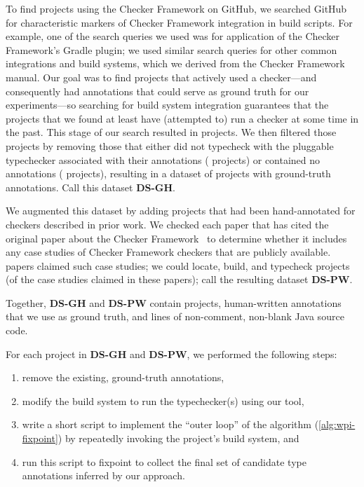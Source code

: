 To find projects using the Checker Framework on GitHub, we searched GitHub for characteristic
markers of Checker Framework integration in build scripts. For example, one of the search
queries we used was for application of the Checker Framework's Gradle plugin; we used similar
search queries for other common integrations and build systems, which we derived from
the Checker Framework manual.
Our goal was to find projects that actively used a checker---and
consequently had annotations that could serve as ground truth for our experiments---so
searching for build system integration guarantees that the projects that we found at least
have (attempted to) run a checker at some time in the past. This stage of our search
resulted in  projects. We then filtered those projects by removing those that
either did not typecheck with the pluggable typechecker associated with their annotations (
projects) or contained no annotations ( projects),
resulting in a dataset of  projects with ground-truth annotations.
Call this dataset \textbf{DS-GH}.

We augmented this dataset by adding projects that had been hand-annotated for checkers
described in prior work. We checked each paper that has cited the original paper
about the Checker Framework~\cite{PapiACPE2008} to determine whether it includes any
case studies of Checker Framework checkers that are publicly available.  papers
claimed such case studies; we could locate, build, and typecheck  projects (of
the  case studies claimed in these papers); call the resulting dataset \textbf{DS-PW}.

Together, \textbf{DS-GH} and \textbf{DS-PW} contain  projects,  human-written
annotations that we use as ground truth, and  lines of non-comment, non-blank Java
source code.

For each project in \textbf{DS-GH} and \textbf{DS-PW}, we performed the following steps:
\begin{enumerate}
\item remove the existing, ground-truth annotations,
\item modify the build system to run the typechecker(s) using our
  tool,
\item write a short script to implement the ``outer loop'' of the algorithm
  (\ie \cref{alg:wpi-fixpoint}) by repeatedly invoking the project's build
  system, and
\item run this script to fixpoint to collect the final set of candidate type annotations
  inferred by our approach.
\end{enumerate}

